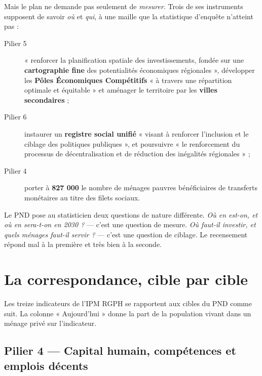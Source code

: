 \documentclass[11pt,a4paper]{article}
\begin{document}
Mais le plan ne demande pas seulement de \emph{mesurer}. Trois de ses instruments supposent de
savoir \emph{où} et \emph{qui}, à une maille que la statistique d'enquête n'atteint pas :

\begin{description}
  \item[Pilier 5] « renforcer la planification spatiale des investissements, fondée sur une
    \textbf{cartographie fine} des potentialités économiques régionales », développer les
    \textbf{Pôles Économiques Compétitifs} « à travers une répartition optimale et équitable » et
    aménager le territoire par les \textbf{villes secondaires} ;
  \item[Pilier 6] instaurer un \textbf{registre social unifié} « visant à renforcer l'inclusion et
    le ciblage des politiques publiques », et poursuivre « le renforcement du processus de
    décentralisation et de réduction des inégalités régionales » ;
  \item[Pilier 4] porter à \textbf{827 000} le nombre de ménages pauvres bénéficiaires de
    transferts monétaires au titre des filets sociaux.
\end{description}

\begin{retenir}
Le PND pose au statisticien deux questions de nature différente. \emph{Où en est-on, et où en
sera-t-on en 2030 ?} --- c'est une question de mesure. \emph{Où faut-il investir, et quels ménages
faut-il servir ?} --- c'est une question de ciblage. Le recensement répond mal à la première et
très bien à la seconde.
\end{retenir}

\section{La correspondance, cible par cible}
\label{sec:correspondance}

Les treize indicateurs de l'IPM RGPH se rapportent aux cibles du PND comme suit. La colonne
« Aujourd'hui » donne la part de la population vivant dans un ménage privé sur l'indicateur.

\subsection{Pilier 4 --- Capital humain, compétences et emplois décents}
\end{document}
